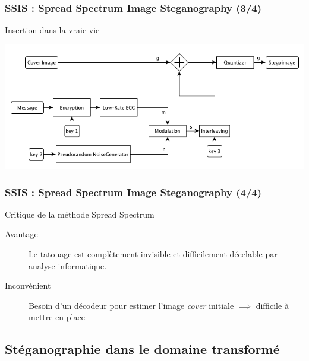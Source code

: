 \documentclass{beamer}
\begin{document}
	\begin{frame}
	\frametitle{SSIS : Spread Spectrum Image Steganography (3/4)}
	\begin{exampleblock}{Insertion dans la vraie vie}
		\begin{center}
		\includegraphics[scale=0.4]{images/SSIS_insert.png}
		\label{fig8}
		\end{center}
	\end{exampleblock}
	\end{frame}
	
		\begin{frame}
	\frametitle{SSIS : Spread Spectrum Image Steganography (4/4)}
	\begin{alertblock}{Critique de la méthode Spread Spectrum}
	\begin{description}
		\item[Avantage] Le tatouage est complètement invisible et difficilement décelable par analyse informatique.
		\item[Inconvénient] Besoin d'un décodeur pour estimer l'image \textit{cover} initiale $\implies$ difficile à mettre en place
	\end{description}
	\end{alertblock}
	\end{frame}
	
	
	
	
	
	\subsection{Stéganographie dans le domaine transformé}
	
\end{document}
